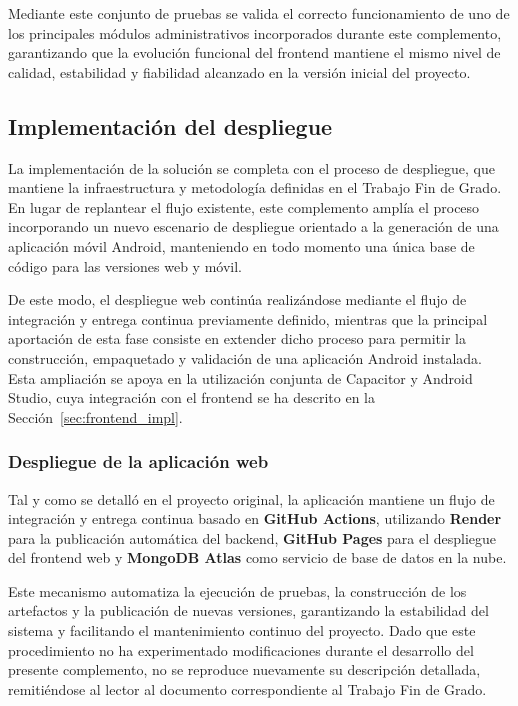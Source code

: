 Mediante este conjunto de pruebas se valida el correcto funcionamiento de uno de los principales módulos administrativos incorporados durante este complemento, garantizando que la evolución funcional del frontend mantiene el mismo nivel de calidad, estabilidad y fiabilidad alcanzado en la versión inicial del proyecto.

\subsection{Implementación del despliegue}
\label{sec:despliegue_impl}

La implementación de la solución se completa con el proceso de despliegue, que mantiene la infraestructura y metodología definidas en el Trabajo Fin de Grado. En lugar de replantear el flujo existente, este complemento amplía el proceso incorporando un nuevo escenario de despliegue orientado a la generación de una aplicación móvil Android, manteniendo en todo momento una única base de código para las versiones web y móvil.

De este modo, el despliegue web continúa realizándose mediante el flujo de integración y entrega continua previamente definido, mientras que la principal aportación de esta fase consiste en extender dicho proceso para permitir la construcción, empaquetado y validación de una aplicación Android instalada. Esta ampliación se apoya en la utilización conjunta de Capacitor y Android Studio, cuya integración con el frontend se ha descrito en la Sección~\ref{sec:frontend_impl}.

\subsubsection{Despliegue de la aplicación web}

Tal y como se detalló en el proyecto original, la aplicación mantiene un flujo de integración y entrega continua basado en \textbf{GitHub Actions}, utilizando \textbf{Render} para la publicación automática del backend, \textbf{GitHub Pages} para el despliegue del frontend web y \textbf{MongoDB Atlas} como servicio de base de datos en la nube.

Este mecanismo automatiza la ejecución de pruebas, la construcción de los artefactos y la publicación de nuevas versiones, garantizando la estabilidad del sistema y facilitando el mantenimiento continuo del proyecto. Dado que este procedimiento no ha experimentado modificaciones durante el desarrollo del presente complemento, no se reproduce nuevamente su descripción detallada, remitiéndose al lector al documento correspondiente al Trabajo Fin de Grado.

